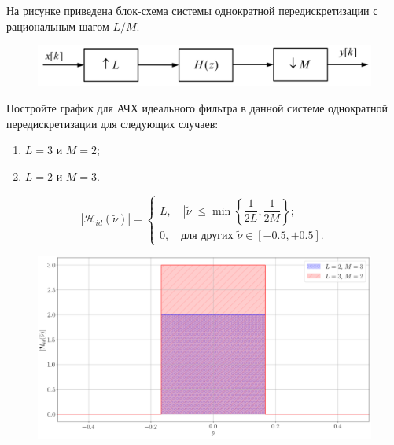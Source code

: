 \protect\thispagestyle{fancy}
\section{}
На рисунке приведена блок-схема системы однократной передискретизации с рациональным шагом $L/M$.

\begin{figure}[!h]
	\centering
	\includegraphics[width=1.\columnwidth]{pics/spring/8/810.png}
	\label{fig:8-1-0}
\end{figure}

Постройте график для АЧХ идеального фильтра в данной системе однократной передискретизации для следующих случаев:

\begin{enumerate}[label=(\alph*)]
	\item $L=3$ и $M=2$;
	\item $L=2$ и $M=3$.
\end{enumerate}

\begin{equation*}
|\mathcal{H}_{id}(\tilde{\nu})| = \begin{cases}
L,\quad |\tilde{\nu}| \leq \min\left\{\dfrac{1}{2L}, \dfrac{1}{2M}\right\};\\
0,\quad \text {для других } \tilde{\nu} \in [-0.5, +0.5].
\end{cases}
\end{equation*}

\begin{figure}[!h]
	\centering
	\includegraphics[width=0.9\columnwidth]{pics/spring/8/8-1.png}
	\label{fig:8-1}
\end{figure}

